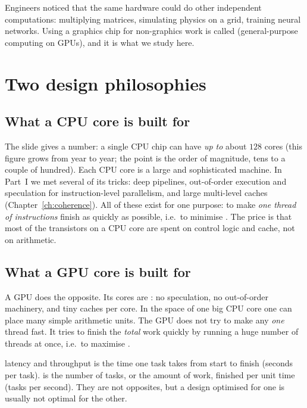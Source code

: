 Engineers noticed that the same hardware could do other independent computations: multiplying
matrices, simulating physics on a grid, training neural networks. Using a graphics chip for
non-graphics work is called  (general-purpose computing on GPUs), and it is what we
study here.

\section{Two design philosophies}

\subsection{What a CPU core is built for}

The slide gives a number: a single CPU chip can have \emph{up to} about $128$ cores (this
figure grows from year to year; the point is the order of magnitude, tens to a couple of hundred). Each CPU core is a
large and sophisticated machine. In Part~I we met several of its tricks: deep pipelines,
out-of-order execution and speculation for instruction-level parallelism, and large multi-level caches
(Chapter~\ref{ch:coherence}). All of these exist for one purpose: to make \emph{one thread of instructions} finish
as quickly as possible, i.e.\ to minimise . The price is that most of the transistors
on a CPU core are spent on control logic and cache, not on arithmetic.

\subsection{What a GPU core is built for}

A GPU does the opposite. Its cores are : no speculation, no out-of-order machinery,
and tiny caches per core. In the space of one big CPU core one can place many simple arithmetic units.
The GPU does not try to make any \emph{one} thread fast. It tries to finish the \emph{total} work
quickly by running a huge number of threads at once, i.e.\ to maximise .

\begin{definition}{latency and throughput}
 is the time one task takes from start to finish (seconds per task).
 is the number of tasks, or the amount of work, finished per unit time (tasks per second).
They are not opposites, but a design optimised for one is usually not optimal for the other.
\end{definition}


